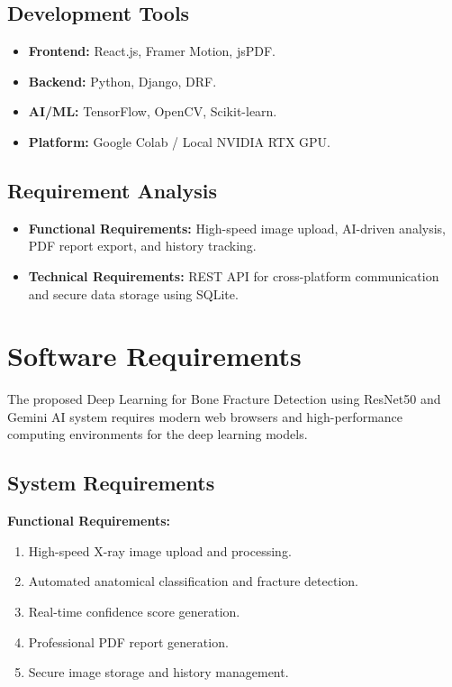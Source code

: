 \documentclass[a4paper,12pt]{report}
\begin{document}
    \subsection{Development Tools}
    \begin{itemize}
        \item \textbf{Frontend:} React.js, Framer Motion, jsPDF.
        \item \textbf{Backend:} Python, Django, DRF.
        \item \textbf{AI/ML:} TensorFlow, OpenCV, Scikit-learn.
        \item \textbf{Platform:} Google Colab / Local NVIDIA RTX GPU.
    \end{itemize}

    \subsection{Requirement Analysis}
    \begin{itemize}
        \item \textbf{Functional Requirements:} High-speed image upload, AI-driven analysis, PDF report export, and history tracking.
        \item \textbf{Technical Requirements:} REST API for cross-platform communication and secure data storage using SQLite.
    \end{itemize}
    \section{Software Requirements}
    The proposed Deep Learning for Bone Fracture Detection using ResNet50 and Gemini AI system requires modern web browsers and high-performance computing environments for the deep learning models.

    \subsection{System Requirements}
    \textbf{Functional Requirements:}
    \begin{enumerate}
        \item High-speed X-ray image upload and processing.
        \item Automated anatomical classification and fracture detection.
        \item Real-time confidence score generation.
        \item Professional PDF report generation.
        \item Secure image storage and history management.
    \end{enumerate}
\end{document}
